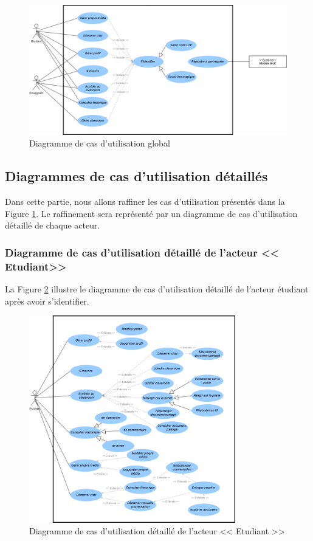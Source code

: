 \begin{figure}[H]
    \centering
    \includegraphics[width=1\textwidth,height=0.45\textheight]{images/chp3/fig2.png}
    \caption{Diagramme de cas d’utilisation global}
    \label{fig:diagramme de cas d’utilisation global}    
\end{figure}

\subsection{Diagrammes de cas d’utilisation détaillés}
Dans cette partie, nous allons raffiner les cas d'utilisation présentés dans la Figure \ref{fig:diagramme de cas d’utilisation global}. Le raffinement sera représenté par un diagramme de cas d'utilisation détaillé de chaque  acteur.

\subsubsection{Diagramme de cas d’utilisation détaillé de l’acteur << Etudiant>>}
La Figure \ref{fig:diagramme de cas d’utilisation détaillé de l’acteur << Etudiant >>} illustre le diagramme de cas d’utilisation détaillé de l’acteur étudiant après avoir s’identifier.
\begin{figure}[H]
    \centering
    \includegraphics[width=0.8\textwidth,height=0.6\textheight]{images/chp3/fig3.png}
    \caption{Diagramme de cas d’utilisation détaillé de l’acteur << Etudiant >>}
    \label{fig:diagramme de cas d’utilisation détaillé de l’acteur << Etudiant >>}    
\end{figure}

